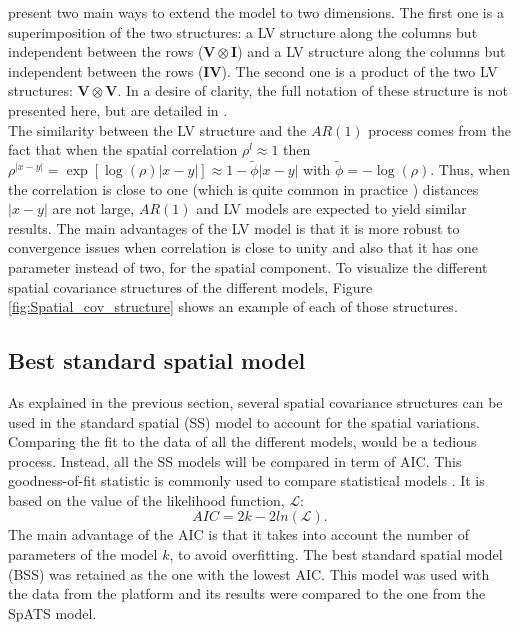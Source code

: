 \textcite{piepho_linear_2010} present two main ways to extend the model to two dimensions. The first one is a superimposition of the two structures: a LV structure along the columns but independent between the rows ($\boldsymbol{V} \otimes \boldsymbol{I}$) and a LV structure along the columns but independent between the rows ($ \boldsymbol{I} \boldsymbol{V}$). The second one is a product of the two LV structures: $\boldsymbol{V} \otimes \boldsymbol{V}$. In a desire of clarity, the full notation of these structure is not presented here, but are detailed in \textcite{piepho_linear_2010}.~\\

The similarity between the LV structure and the $AR(1)$ process comes from the fact that when the spatial correlation $\rho^{l} \approx 1$ then 
$\rho^{\left| x-y \right|}=\exp \left[\log (\rho)\left| x-y \right|\right] \approx 1-\tilde{\phi}\left| x -y \right|$ with 
$\tilde{\phi} = -\log(\rho)$. 
Thus, when the correlation is close to one (which is quite common in practice \parencite{pilarczyk2007extent}) distances $\left| x-y \right|$ are not large, $AR(1)$ and LV models are expected to yield similar results. The main advantages of the LV model is that it is more robust to convergence issues when correlation is close to unity and also that it has one parameter instead of two, for the spatial component. To visualize the different spatial covariance structures of the different models, Figure \ref{fig:Spatial_cov_structure} shows an example of each of those structures. 



\subsection{Best standard spatial model}
As explained in the previous section, several spatial covariance structures can be used in the standard spatial (SS) model to account for the spatial variations. Comparing the fit to the data of all the different models, would be a tedious process. Instead, all the SS models will be compared in term of AIC. This goodness-of-fit statistic is commonly used to compare statistical models \parencite{piepho_linear_2010,gilmour_accounting_1997,velazco_modelling_2017}. It is based on the value of the likelihood function, $\mathcal{L}$:
\begin{equation}
	AIC = 2k - 2ln(\mathcal{L})
	\text{.}
\end{equation}
The main advantage of the AIC is that it takes into account the number of parameters of the model $k$, to avoid overfitting. The best standard spatial model (BSS) was retained as the one with the lowest AIC. This model was used with the data from the platform and its results were compared to the one from the SpATS model.

